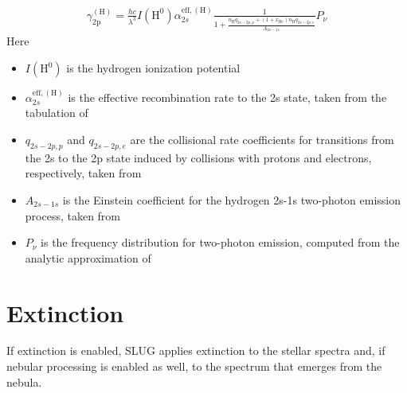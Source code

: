 \documentclass[letterpaper,10pt,english]{sphinxmanual}
\begin{document}
\begin{equation*}
\begin{split}\gamma_{\mathrm{2p}}^{(\mathrm{H})} = \frac{hc}{\lambda^3} I(\mathrm{H}^0) \alpha_{2s}^{\mathrm{eff,(H)}} \frac{1}{1 + \frac{n_{\mathrm{H}} q_{2s-2p,p} + (1+x_{\mathrm{He}}) n_{\mathrm{H}} q_{2s-2p,e}}{A_{2s-1s}}} P_\nu\end{split}
\end{equation*}
Here
\begin{itemize}
\item {} 
\(I(\mathrm{H}^0)\) is the hydrogen ionization potential

\item {} 
\(\alpha_{2s}^{\mathrm{eff,(H)}}\) is the effective recombination rate to the 2s state, taken from the tabulation of 

\item {} 
\(q_{2s-2p,p}\) and \(q_{2s-2p,e}\) are the collisional rate coefficients for transitions from the 2s to the 2p state induced by collisions with protons and electrons, respectively, taken from 

\item {} 
\(A_{2s-1s}\) is the Einstein coefficient for the hydrogen 2s-1s two-photon emission process, taken from 

\item {} 
\(P_\nu\) is the frequency distribution for two-photon emission, computed from the analytic approximation of 

\end{itemize}


\section{Extinction}
\label{\detokenize{intro:extinction}}\label{\detokenize{intro:ssec-extinction}}
If extinction is enabled, SLUG applies extinction to the stellar spectra and, if nebular processing is enabled as well, to the spectrum that emerges from the nebula.
\end{document}
